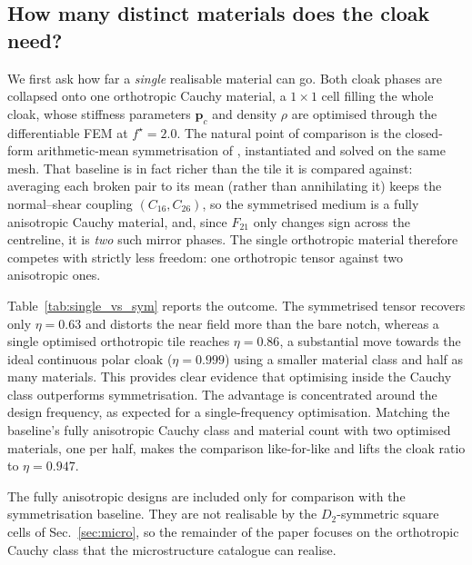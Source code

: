 \documentclass[preprint,12pt]{elsarticle}
\newcommand{\mbf}[1]{\mathbf{#1}}
\begin{document}
\subsection{How many distinct materials does the cloak need?}\label{subsec:four_materials}

We first ask how far a \emph{single} realisable material can go. Both
cloak phases are collapsed onto one orthotropic Cauchy material, a
$1\times1$ cell filling the whole cloak, whose stiffness parameters
$\mbf{p}_c$ and density $\rho$ are optimised through the differentiable
FEM at $f^\star=2.0$. The natural point of comparison is the closed-form arithmetic-mean symmetrisation of \citet{chatzopoulos2023}, instantiated and solved on the same mesh. That baseline is in fact richer than the tile it is compared against: averaging each
broken pair to its mean (rather than annihilating it) keeps the normal--shear
coupling $(C_{16},C_{26})$, so the symmetrised medium is a fully
anisotropic Cauchy material, and, since $F_{21}$ only changes sign across
the centreline, it is \emph{two} such mirror phases. The single orthotropic material therefore competes with strictly less freedom: one orthotropic tensor against two
anisotropic ones.

Table~\ref{tab:single_vs_sym} reports the outcome. The symmetrised tensor
recovers only $\eta=0.63$ and distorts the near field more than the bare notch,
whereas a single optimised orthotropic tile reaches $\eta=0.86$, a
substantial move towards the ideal continuous polar cloak
($\eta=0.999$) using a smaller material class and half as many
materials. This provides clear evidence that optimising inside the
Cauchy class outperforms symmetrisation.
The advantage is concentrated around the design frequency, as expected for a
single-frequency optimisation. Matching the baseline's fully anisotropic Cauchy class and material count with two optimised materials, one per half, makes the comparison
like-for-like and lifts the cloak ratio to $\eta=0.947$.

The fully anisotropic designs are included only for comparison with the
symmetrisation baseline. They are not realisable by the
$D_2$-symmetric square cells of Sec.~\ref{sec:micro}, so the remainder
of the paper focuses on the orthotropic Cauchy class that the
microstructure catalogue can realise.
\end{document}
